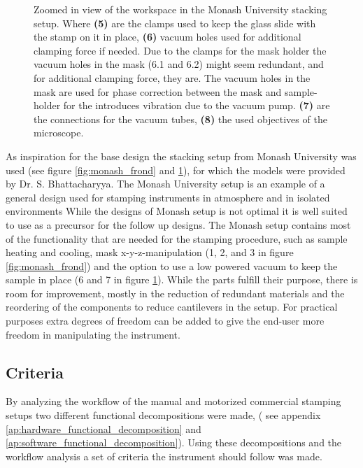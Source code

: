 \documentclass[10pt]{article}
\begin{document}
\begin{figure}[H]
\begin{minipage}[b]{0.53\textwidth}
    \caption{Zoomed in view of the workspace in the Monash University stacking setup. Where \textbf{(5)} are the clamps used to keep the glass slide with the stamp on it in place, \textbf{(6)} vacuum holes used for additional clamping force if needed. Due to the clamps for the mask holder the vacuum holes in the mask (6.1 and 6.2) might seem redundant, and for additional clamping force, they are. The vacuum holes in the mask are used for phase correction between the mask and sample-holder for the introduces vibration due to the vacuum pump. \textbf{(7)} are the connections for the vacuum tubes, \textbf{(8)} the used objectives of the microscope.}
    \label{fig:monash_side}
  \end{minipage}
\end{figure}

As inspiration for the base design the stacking setup from Monash University was used (see figure \ref{fig:monash_frond} and \ref{fig:monash_side}), for which the models were provided by Dr. S. Bhattacharyya. 
The Monash University setup is an example of a general design used for stamping instruments in atmosphere and in isolated environments \cite{castellanos-gomezDeterministicTransferTwodimensional2014,zhaoInexpensiveSystemDeterministic2020,gantSystemDeterministicTransfer2020}
While the designs of Monash setup is not optimal it is well suited to use as a precursor for the follow up designs. 
The Monash setup contains most of the functionality that are needed for the stamping procedure, such as sample heating and cooling, mask x-y-z-manipulation (1, 2, and 3 in figure \ref{fig:monash_frond}) and the option to use a low powered vacuum to keep the sample in place (6 and 7 in figure \ref{fig:monash_side}).
While the parts fulfill their purpose, there is room for improvement, mostly in the reduction of redundant materials and the reordering of the components to reduce cantilevers in the setup.
For practical purposes extra degrees of freedom can be added to give the end-user more freedom in manipulating the instrument.

\subsection{Criteria}
\label{ch:criteria}
By analyzing the workflow of the manual and motorized commercial stamping setups \cite{castellanos-gomezDeterministicTransferTwodimensional2014,gantSystemDeterministicTransfer2020,huangReliableExfoliationLargeArea2015,HQGrapheneSystemsDesigns,zhaoInexpensiveSystemDeterministic2020} two different functional decompositions were made, ( see appendix \ref{ap:hardware_functional_decomposition} and \ref{ap:software_functional_decomposition}). Using these decompositions and the workflow analysis a set of criteria the instrument should follow was made.
\end{document}
